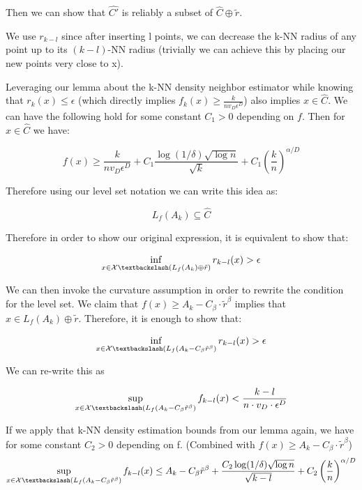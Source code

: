 Then we can show that $\hat{C'}$ is reliably a subset of $\hat{C}\oplus\tilde{r}$. 

We use $r_{k-l}$ since after inserting l points, we can decrease the k-NN radius of any point up to its $(k-l)$-NN radius (trivially we can achieve this by placing our new points very close to x).

Leveraging our lemma about the k-NN density neighbor estimator while knowing that $r_k(x)\leq \epsilon$ (which directly implies $f_k(x) \geq \frac{k}{nv_D\epsilon^D}$) also implies $x\in\hat{C}$. We can have the following hold for some constant $C_1>0$ depending on $f$. Then for $x \in \hat{C}$ we have:

\begin{equation*}
    f(x) \geq \frac{k}{nv_D\epsilon^D} +  C_1 \frac{\log(1/\delta)\sqrt{\log n}}{\sqrt{k}} + C_1\left(\frac{k}{n}\right)^{\alpha/D}
\end{equation*}

Therefore using our level set notation we can write this idea as:

\begin{equation*}
    L_{f}(A_k) \subseteq \hat{C}
\end{equation*}

Therefore in order to show our original expression, it is equivalent to show that:

\begin{equation*}
    \inf\limits_{x\in\mathcal{X} \textbackslash (L_{f}(A_k)\oplus\tilde{r})} r_{k-l}(x)>\epsilon
\end{equation*}

We can then invoke the curvature assumption in order to rewrite the condition for the level set. We claim that $f(x)\geq A_k-C_{\beta}\cdot\tilde{r}^{\beta}$ implies that $x \in L_{f}(A_k) \oplus \tilde{r}$. Therefore, it is enough to show that:

\begin{equation*}
    \inf\limits_{x\in\mathcal{X} \textbackslash (L_{f}(A_k - C_{\beta}\tilde{r}^{\beta})} r_{k-l}(x)>\epsilon
\end{equation*}

We can re-write this as

\begin{equation*}
    \sup\limits_{x\in\mathcal{X} \textbackslash (L_{f}(A_k - C_{\beta}\tilde{r}^{\beta})} f_{k-l}(x)<\frac{k-l}{n\cdot v_D\cdot \epsilon^D}
\end{equation*}

If we apply that k-NN density estimation bounds from our lemma again, we have for some constant $C_2>0$ depending on f. (Combined with $f(x)\geq A_k - C_{\beta}\cdot\tilde{r}^{\beta}$)
\begin{equation*}
    \sup\limits_{x\in\mathcal{X} \textbackslash (L_{f}(A_k - C_{\beta}\tilde{r}^{\beta})} f_{k-l}(x)\leq A_k - C_{\beta}\tilde{r}^{\beta}+ \frac{C_2\log(1/\delta)\sqrt{\log n}}{\sqrt{k-l}} + C_2\left(\frac{k}{n}\right)^{\alpha/D}
\end{equation*}

